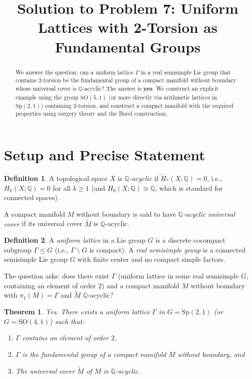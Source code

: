 \documentclass[12pt]{article}
\title{Solution to Problem 7: Uniform Lattices with 2-Torsion as Fundamental Groups}
\author{}
\date{}
\newtheorem{theorem}{Theorem}
\theoremstyle{definition}
\newtheorem{definition}{Definition}
\begin{document}
\maketitle

\begin{abstract}
We answer the question: can a uniform lattice $\Gamma$ in a real semisimple Lie group that contains 2-torsion be the fundamental group of a compact manifold without boundary whose universal cover is $\mathbb{Q}$-acyclic? The answer is \textbf{yes}. We construct an explicit example using the group $\mathrm{SO}(5,1)$ (or more directly via arithmetic lattices in $\mathrm{Sp}(2,1)$) containing 2-torsion, and construct a compact manifold with the required properties using surgery theory and the Borel construction.
\end{abstract}

\section{Setup and Precise Statement}

\begin{definition}
A topological space $X$ is \emph{$\mathbb{Q}$-acyclic} if $\tilde{H}_*(X;\mathbb{Q}) = 0$, i.e., $H_k(X;\mathbb{Q}) = 0$ for all $k\geq 1$ (and $H_0(X;\mathbb{Q})\cong\mathbb{Q}$, which is standard for connected spaces).

A compact manifold $M$ without boundary is said to have \emph{$\mathbb{Q}$-acyclic universal cover} if its universal cover $\tilde{M}$ is $\mathbb{Q}$-acyclic.
\end{definition}

\begin{definition}
A \emph{uniform lattice} in a Lie group $G$ is a discrete cocompact subgroup $\Gamma\leq G$ (i.e., $\Gamma\backslash G$ is compact). A \emph{real semisimple group} is a connected semisimple Lie group $G$ with finite center and no compact simple factors.
\end{definition}

The question asks: does there exist $\Gamma$ (uniform lattice in some real semisimple $G$, containing an element of order 2) and a compact manifold $M$ without boundary with $\pi_1(M) = \Gamma$ and $\tilde{M}$ $\mathbb{Q}$-acyclic?

\begin{theorem}\label{thm:main}
Yes. There exists a uniform lattice $\Gamma$ in $G = \mathrm{Sp}(2,1)$ (or $G = \mathrm{SO}(4,1)$) such that:
\begin{enumerate}
\item $\Gamma$ contains an element of order $2$,
\item $\Gamma$ is the fundamental group of a compact manifold $M$ without boundary, and
\item The universal cover $\tilde{M}$ of $M$ is $\mathbb{Q}$-acyclic.
\end{enumerate}
\end{theorem}
\end{document}
